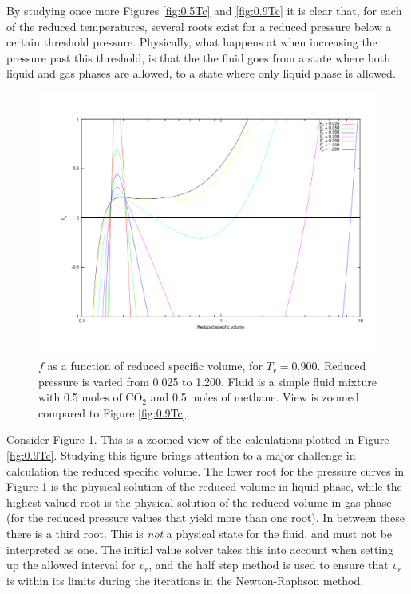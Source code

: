 \documentclass[english]{../thermomemo/thermomemo}
\numberwithin{equation}{section}
\begin{document}
By studying once more Figures \ref{fig:0.5Tc} and \ref{fig:0.9Tc} it is clear that, for each of the reduced temperatures, several roots exist for a reduced pressure below a certain threshold pressure. Physically, what happens at when increasing the pressure past this threshold, is that the the fluid goes from a state where both liquid and gas phases are allowed, to a state where only liquid phase is allowed.

\begin{figure}
	\centering
	\includegraphics[trim = 1.5cm 2cm 0 1cm, clip = true, width=14cm]{09TcZoom}
	\caption{$f$ as a function of reduced specific volume, for $T_r = 0.900$. Reduced pressure is varied from 0.025 to 1.200. Fluid is a simple fluid mixture with 0.5 moles of CO$_2$ and 0.5 moles of methane. View is zoomed compared to Figure \ref{fig:0.9Tc}.}
	\label{fig:0.9TcZoom}
\end{figure}

Consider Figure \ref{fig:0.9TcZoom}. This is a zoomed view of the calculations plotted in Figure \ref{fig:0.9Tc}. Studying this figure brings attention to a major challenge in calculation the reduced specific volume. The lower root for the pressure curves in Figure \ref{fig:0.9TcZoom} is the physical solution of the reduced volume in liquid phase, while the highest valued root is the physical solution of the reduced volume in gas phase (for the reduced pressure values that yield more than one root). In between these there is a third root. This is \textit{not} a physical state for the fluid, and must not be interpreted as one. The initial value solver takes this into account when setting up the allowed interval for $v_r$, and the half step method is used to ensure that $v_r$ is within its limits during the iterations in the Newton-Raphson method.
\end{document}
